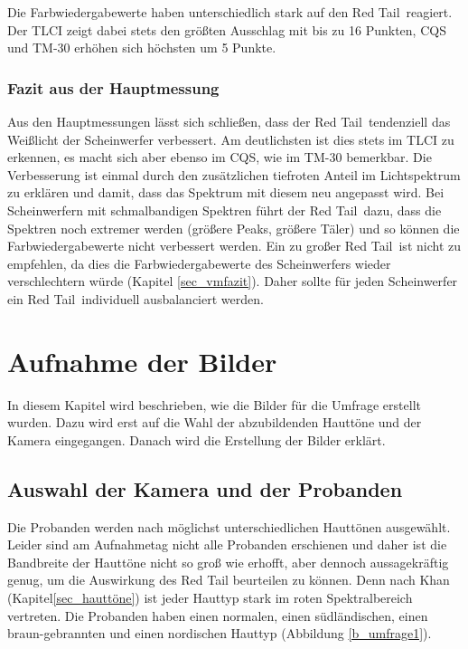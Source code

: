 \noindent Die Farbwiedergabewerte haben unterschiedlich stark auf den \glqq Red Tail\grqq\ reagiert. Der TLCI zeigt dabei stets den größten Ausschlag mit bis zu 16 Punkten, CQS und TM-30 erhöhen sich höchsten um 5 Punkte. 

\newpage
\subsection{Fazit aus der Hauptmessung}
\label{sec_fazithm}
Aus den Hauptmessungen lässt sich schließen, dass der \glqq Red Tail\grqq\ tendenziell das Weißlicht der Scheinwerfer verbessert. Am deutlichsten ist dies stets im TLCI zu erkennen, es macht sich aber ebenso im CQS, wie im TM-30 bemerkbar. Die Verbesserung ist einmal durch den zusätzlichen tiefroten Anteil im Lichtspektrum zu erklären und damit, dass das Spektrum mit diesem neu angepasst wird. Bei Scheinwerfern mit schmalbandigen Spektren führt der \glqq Red Tail\grqq\ dazu, dass die Spektren noch extremer werden (größere Peaks, größere Täler) und so können die Farbwiedergabewerte nicht verbessert werden. Ein zu großer \glqq Red Tail\grqq\ ist nicht zu empfehlen, da dies die Farbwiedergabewerte des Scheinwerfers wieder verschlechtern würde (Kapitel \ref{sec_vmfazit}). Daher sollte für jeden Scheinwerfer ein \glqq Red Tail\grqq\ individuell ausbalanciert werden.


\chapter{Aufnahme der Bilder}
In diesem Kapitel wird beschrieben, wie die Bilder für die Umfrage erstellt wurden. Dazu wird erst auf die Wahl der abzubildenden Hauttöne und der Kamera eingegangen. Danach wird die Erstellung der Bilder erklärt.
\section{Auswahl der Kamera und der Probanden}
\label{sec_wahlderKamera}
Die Probanden werden nach möglichst unterschiedlichen Hauttönen ausgewählt. Leider sind am Aufnahmetag nicht alle Probanden erschienen und daher ist die Bandbreite der Hauttöne nicht so groß wie erhofft, aber dennoch aussagekräftig genug, um die Auswirkung des Red Tail beurteilen zu können. Denn nach Khan (Kapitel\ref{sec_hauttöne}) ist jeder Hauttyp stark im roten Spektralbereich vertreten. Die Probanden haben einen normalen, einen südländischen, einen braun-gebrannten und einen nordischen Hauttyp (Abbildung \ref{b_umfrage1}). 

